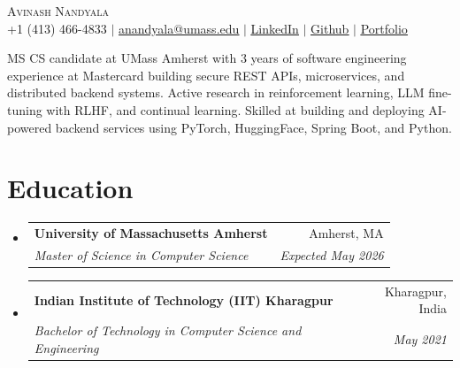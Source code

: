 \documentclass[letterpaper,11pt]{article}
\makeatletter
\newcommand{\resumeSubheading}[4]{
  \vspace{-2pt}\item
    \begin{tabular*}{0.97\textwidth}[t]{l@{\extracolsep{\fill}}r}
      \textbf{#1} & #2 \\
      \textit{\small#3} & \textit{\small #4} \\
    \end{tabular*}\vspace{-7pt}
}
\newcommand{\resumeSubHeadingListStart}{\begin{itemize}[leftmargin=0.15in, label={}]}
\newcommand{\resumeSubHeadingListEnd}{\end{itemize}}
\makeatother
\begin{document}

\begin{center}
  {\Huge\textsc{Avinash Nandyala}} \\ \vspace{1pt}
  \small +1 (413) 466-4833 $|$ \href{mailto:anandyala@umass.edu}{\underline{anandyala@umass.edu}} $|$
  \href{https://www.linkedin.com/in/avinash-nandyala-06a88b199/}{\underline{LinkedIn}} $|$
  \href{https://github.com/navinash47}{\underline{Github}} $|$
  \href{https://navinash47.github.io/Portfolio/}{\underline{Portfolio}}
\end{center}

\begin{center}
  \small{MS CS candidate at UMass Amherst with 3 years of software engineering experience at Mastercard building secure REST APIs, microservices, and distributed backend systems. Active research in reinforcement learning, LLM fine-tuning with RLHF, and continual learning. Skilled at building and deploying AI-powered backend services using PyTorch, HuggingFace, Spring Boot, and Python.}
\end{center}

\section{Education}
\resumeSubHeadingListStart
  \resumeSubheading
    {University of Massachusetts Amherst}{Amherst, MA}
    {Master of Science in Computer Science}{Expected May 2026}
  \resumeSubheading
    {Indian Institute of Technology (IIT) Kharagpur}{Kharagpur, India}
    {Bachelor of Technology in Computer Science and Engineering}{May 2021}
\resumeSubHeadingListEnd


\end{document}
